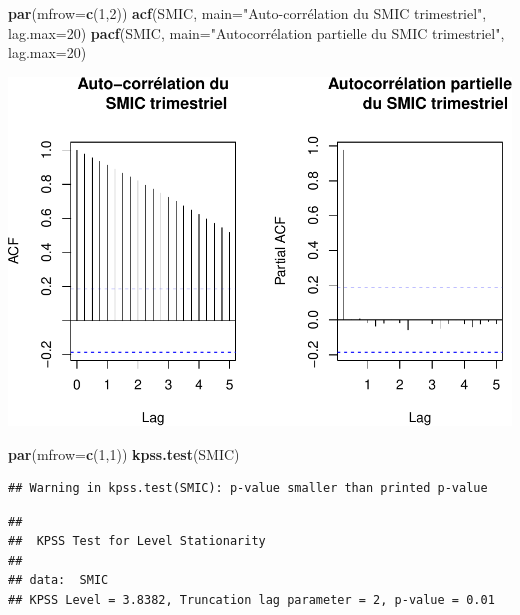 \documentclass[11pt,]{article}
\newenvironment{Shaded}{\begin{snugshade}}{\end{snugshade}}
\newcommand{\KeywordTok}[1]{\textcolor[rgb]{0.13,0.29,0.53}{\textbf{{#1}}}}
\newcommand{\DataTypeTok}[1]{\textcolor[rgb]{0.13,0.29,0.53}{{#1}}}
\newcommand{\DecValTok}[1]{\textcolor[rgb]{0.00,0.00,0.81}{{#1}}}
\newcommand{\StringTok}[1]{\textcolor[rgb]{0.31,0.60,0.02}{{#1}}}
\newcommand{\NormalTok}[1]{{#1}}
\begin{document}
\begin{Shaded}
\begin{Highlighting}[]
  \KeywordTok{par}\NormalTok{(}\DataTypeTok{mfrow=}\KeywordTok{c}\NormalTok{(}\DecValTok{1}\NormalTok{,}\DecValTok{2}\NormalTok{))}
  \KeywordTok{acf}\NormalTok{(SMIC, }\DataTypeTok{main=}\StringTok{"Auto-corrélation du}
\StringTok{      SMIC trimestriel"}\NormalTok{, }\DataTypeTok{lag.max=}\DecValTok{20}\NormalTok{)}
  \KeywordTok{pacf}\NormalTok{(SMIC, }\DataTypeTok{main=}\StringTok{"Autocorrélation partielle}
\StringTok{       du SMIC trimestriel"}\NormalTok{, }\DataTypeTok{lag.max=}\DecValTok{20}\NormalTok{)}
\end{Highlighting}
\end{Shaded}

\includegraphics{doc_files/figure-latex/unnamed-chunk-4-2.pdf}

\begin{Shaded}
\begin{Highlighting}[]
  \KeywordTok{par}\NormalTok{(}\DataTypeTok{mfrow=}\KeywordTok{c}\NormalTok{(}\DecValTok{1}\NormalTok{,}\DecValTok{1}\NormalTok{))}
  \KeywordTok{kpss.test}\NormalTok{(SMIC)}
\end{Highlighting}
\end{Shaded}

\begin{verbatim}
## Warning in kpss.test(SMIC): p-value smaller than printed p-value
\end{verbatim}

\begin{verbatim}
## 
##  KPSS Test for Level Stationarity
## 
## data:  SMIC
## KPSS Level = 3.8382, Truncation lag parameter = 2, p-value = 0.01
\end{verbatim}
\end{document}
